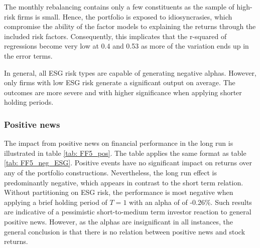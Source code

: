 The monthly rebalancing contains only a few constituents as the sample of high-risk firms is small. Hence, the portfolio is exposed to idiosyncrasies, which compromise the ability of the factor models to explaining the returns through the included risk factors. Consequently, this implicates that the r-squared of regressions become very low at 0.4 and 0.53 as more of the variation ends up in the error terms. 

In general, all ESG risk types are capable of generating negative alphas. However, only firms with low ESG risk generate a significant output on average. The outcomes are more severe and with higher significance when applying shorter holding periods.   


\subsubsection{Positive news}

The impact from positive news on financial performance in the long run is illustrated in table \ref{tab: FF5_pos}. The table applies the same format as table \ref{tab: FF5_neg_ESG}. Positive events have no significant impact on returns over any of the portfolio constructions. Nevertheless, the long run effect is predominantly negative, which appears in contrast to the short term relation. Without partitioning on ESG risk, the performance is most negative when applying a brief holding period of $T=1$ with an alpha of of -0.26\%.   
Such results are indicative of a pessimistic short-to-medium term investor reaction to general positive news. However, as the alphas are insignificant in all instances, the general conclusion is that there is no relation between positive news and stock returns.  


